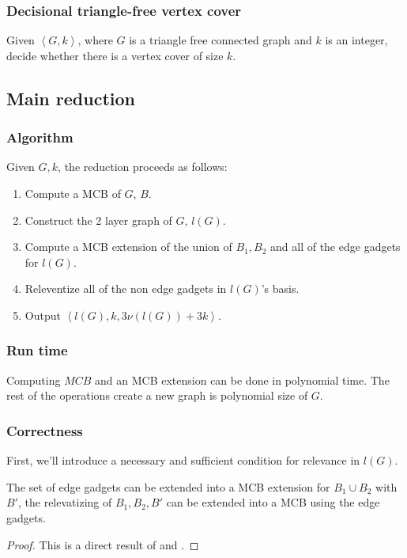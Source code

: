 \subsubsection{Decisional triangle-free vertex cover}
Given $\left<G,k\right>$, where $G$ is a triangle free connected graph and $k$ is an integer, decide whether there is a vertex cover of size $k$.

\subsection{Main reduction}
\subsubsection{Algorithm}
Given $G,k$, the reduction proceeds as follows:
\begin{enumerate}
    \item Compute a MCB of $G$, $B$.
    \item Construct the 2 layer graph of $G$, $l(G)$.
    \item Compute a MCB extension of the union of $B_1,B_2$ and all of the edge gadgets for $l(G)$.
    \item Releventize all of the non edge gadgets in $l(G)$'s basis.
    \item Output $\left<l(G),k, 3\nu(l(G))+3k\right>$.
\end{enumerate}
\subsubsection{Run time}
Computing $MCB$ and an MCB extension can be done in polynomial time. The rest of the operations create a new graph is polynomial size of $G$.

\subsubsection{Correctness}
First, we'll introduce a necessary and sufficient condition for relevance in $l(G)$.

\begin{corollary}
    The set of edge gadgets can be extended into a MCB extension for $B_1\cup B_2$ with $B'$, the relevatizing of $B_1,B_2,B'$ can be extended into a MCB using the edge gadgets.
\end{corollary}
\begin{proof}
    This is a direct result of 
     and .
\end{proof}

